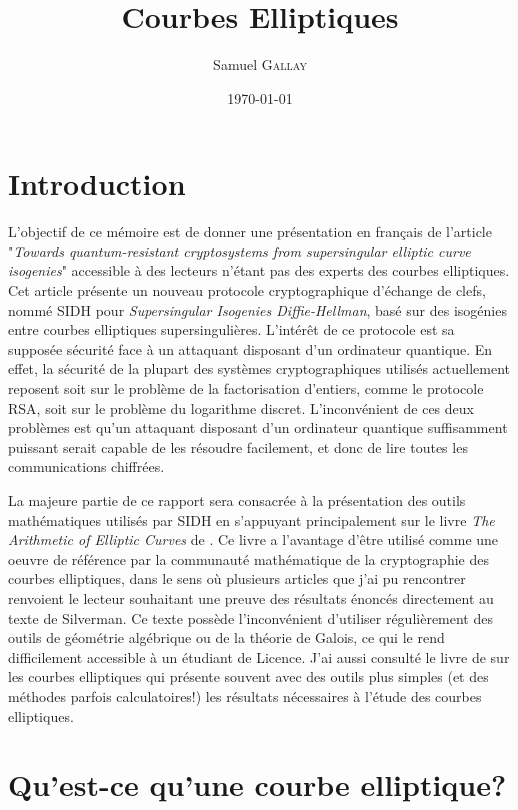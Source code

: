 \documentclass{article}
\title{Courbes Elliptiques}
\author{Samuel \textsc{Gallay}}
\date{\today}
\theoremstyle{plain}%
\theoremstyle{definition}%
\begin{document}
\maketitle

\tableofcontents

\newpage

\section{Introduction}


L'objectif de ce mémoire est de donner une présentation en français de l'article \cite{DeFeo} "\emph{Towards quantum-resistant cryptosystems from supersingular elliptic curve isogenies}" accessible à des lecteurs n'étant pas des experts des courbes elliptiques.
Cet article présente un nouveau protocole cryptographique d'échange de clefs, nommé SIDH pour \emph{Supersingular Isogenies Diffie-Hellman}, basé sur des isogénies entre courbes elliptiques supersingulières. 
L'intérêt de ce protocole est sa supposée sécurité face à un attaquant disposant d'un ordinateur quantique. 
En effet, la sécurité de la plupart des systèmes cryptographiques utilisés actuellement reposent soit sur le problème de la factorisation d'entiers, comme le protocole RSA, soit sur le problème du logarithme discret. 
L'inconvénient de ces deux problèmes est qu'un attaquant disposant d'un ordinateur quantique suffisamment puissant serait capable de les résoudre facilement, et donc de lire toutes les communications chiffrées.

La majeure partie de ce rapport sera consacrée à la présentation des outils mathématiques utilisés par SIDH en s'appuyant principalement sur le livre \emph{The Arithmetic of Elliptic Curves} de \cite{Silverman}. Ce livre a l'avantage d'être utilisé comme une oeuvre de référence par la communauté mathématique de la cryptographie des courbes elliptiques, dans le sens où plusieurs articles que j'ai pu rencontrer renvoient le lecteur souhaitant une preuve des résultats énoncés directement au texte de Silverman. Ce texte possède l'inconvénient d'utiliser régulièrement des outils de géométrie algébrique ou de la théorie de Galois, ce qui le rend difficilement accessible à un étudiant de Licence. J'ai aussi consulté le livre de \cite{Washington} sur les courbes elliptiques qui présente souvent avec des outils plus simples (et des méthodes parfois calculatoires!) les résultats nécessaires à l'étude des courbes elliptiques. 

\section{Qu'est-ce qu'une courbe elliptique?}
\end{document}
